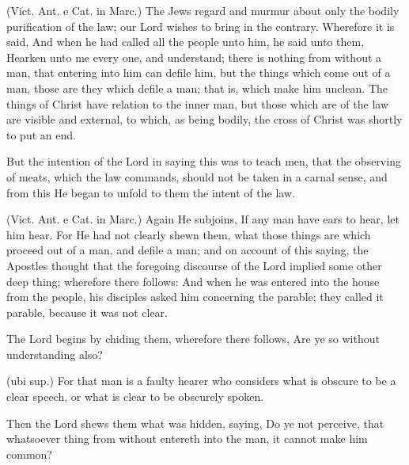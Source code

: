  (Vict. Ant. e Cat. in Marc.) The Jews regard and murmur about only the bodily purification of the law; our Lord wishes to bring in the contrary. Wherefore it is said, And when he had called all the people unto him, he said unto them, Hearken unto me every one, and understand; there is nothing from without a man, that entering into him can defile him, but the things which come out of a man, those are they which defile a man; that is, which make him unclean. The things of Christ have relation to the inner man, but those which are of the law are visible and external, to which, as being bodily, the cross of Christ was shortly to put an end.

 But the intention of the Lord in saying this was to teach men, that the observing of meats, which the law commands, should not be taken in a carnal sense, and from this He began to unfold to them the intent of the law.

 (Vict. Ant. e Cat. in Marc.) Again He subjoins, If any man have ears to hear, let him hear. For He had not clearly shewn them, what those things are which proceed out of a man, and defile a man; and on account of this saying, the Apostles thought that the foregoing discourse of the Lord implied some other deep thing; wherefore there follows: And when he was entered into the house from the people, his disciples asked him concerning the parable; they called it parable, because it was not clear.

 The Lord begins by chiding them, wherefore there follows, Are ye so without understanding also?

 (ubi sup.) For that man is a faulty hearer who considers what is obscure to be a clear speech, or what is clear to be obscurely spoken.

 Then the Lord shews them what was hidden, saying, Do ye not perceive, that whatsoever thing from without entereth into the man, it cannot make him common?

